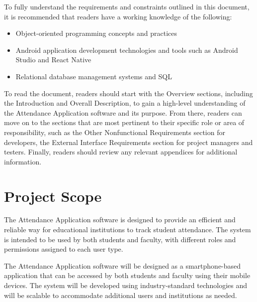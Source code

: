 \documentclass{scrreprt}
\begin{document}
To fully understand the requirements and constraints outlined in this document, it is recommended that readers have a working knowledge of the following:

\begin{itemize}
    \item Object-oriented programming concepts and practices
    \item Android application development technologies and tools such as Android Studio and React Native
    \item Relational database management systems and SQL
\end{itemize}

To read the document, readers should start with the Overview sections, including the Introduction and Overall Description,
 to gain a high-level understanding of the Attendance Application software and its purpose. From there, readers can move on to the sections 
 that are most pertinent to their specific role or area of responsibility, such as the Other Nonfunctional Requirements section for developers,
  the External Interface Requirements section for project managers and testers. Finally, readers should review any relevant appendices for additional information.

\section{Project Scope}
The Attendance Application software is designed to provide an efficient and reliable way for educational institutions to track student attendance. The system is intended to be used by both students and faculty, with different roles and permissions assigned to each user type.

The Attendance Application software will be designed as a smartphone-based application that can be accessed by both students and faculty using their mobile devices. The system will be developed using industry-standard technologies and will be scalable to accommodate additional users and institutions as needed.

\end{document}
